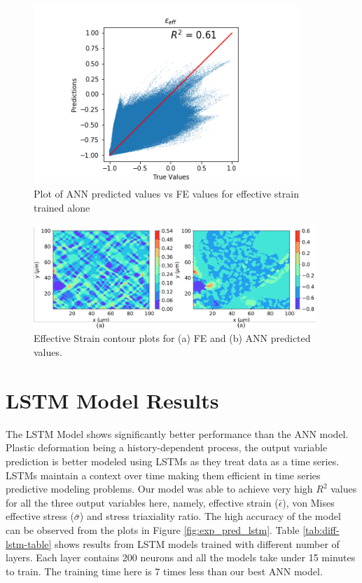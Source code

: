 \begin{figure}[!h]
	\centering
	\includegraphics[width=0.9\textwidth]{Pictures/strain_eff_pred_exp.png}
	\hspace{1mm}
	\caption{Plot of ANN predicted values vs FE values for effective strain trained alone} 
	\label{fig:r2-ann}
\end{figure}

\begin{figure}[!h]
	\centering
	\includegraphics[width=0.95\textwidth]{Pictures/ann-res/ann-contours.png}
	\hspace{1mm}
	\caption{Effective Strain contour plots for (a) FE and (b) ANN predicted values.} 
	\label{fig:ann-contours}
\end{figure}
\newpage
\section{LSTM Model Results}
The LSTM Model shows significantly better performance than the ANN model. Plastic deformation being a history-dependent process, the output variable prediction is better modeled using LSTMs as they treat data as a time series. LSTMs maintain a context over time making them efficient in time series predictive modeling problems. Our model was able to achieve very high $R^2$ values for all the three output variables here, namely, effective strain (${\bar{\epsilon}}$), von Mises effective stress ($\bar{\sigma}$) and stress triaxiality ratio. The high accuracy of the model can be observed from the plots in
Figure \ref{fig:exp_pred_lstm}. Table \ref{tab:diff-lstm-table} shows results from LSTM models trained with different number of layers. Each layer contains 200 neurons and all the models take under 15 minutes to train. The training time here is 7 times less than our best ANN model. 

